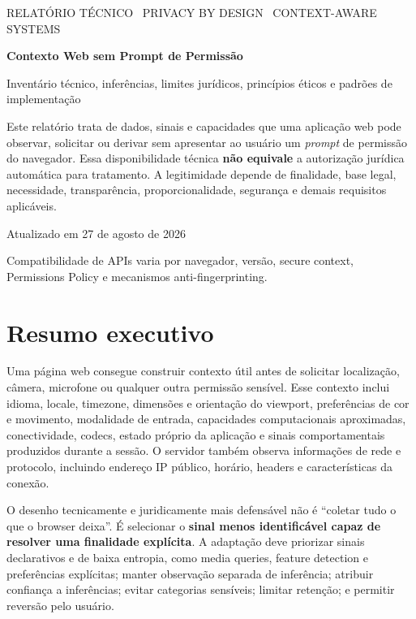 \documentclass[11pt,a4paper]{article}
\begin{document}
\begin{titlepage}
\color{navy}
\vspace*{2cm}
{\small RELATÓRIO TÉCNICO \textbullet\ PRIVACY BY DESIGN \textbullet\ CONTEXT-AWARE SYSTEMS\par}
\vspace{.8cm}
{\Huge\bfseries Contexto Web sem Prompt de Permissão\par}
\vspace{.5cm}
{\Large Inventário técnico, inferências, limites jurídicos, princípios éticos e padrões de implementação\par}
\vfill
\begin{noteBox}[Escopo]
Este relatório trata de dados, sinais e capacidades que uma aplicação web pode observar, solicitar ou derivar sem apresentar ao usuário um \emph{prompt} de permissão do navegador. Essa disponibilidade técnica \textbf{não equivale} a autorização jurídica automática para tratamento. A legitimidade depende de finalidade, base legal, necessidade, transparência, proporcionalidade, segurança e demais requisitos aplicáveis.
\end{noteBox}
\vfill
{\large Atualizado em 27 de agosto de 2026\par}
{\small Compatibilidade de APIs varia por navegador, versão, secure context, Permissions Policy e mecanismos anti-fingerprinting.\par}
\end{titlepage}

\tableofcontents
\newpage

\section{Resumo executivo}
Uma página web consegue construir contexto útil antes de solicitar localização, câmera, microfone ou qualquer outra permissão sensível. Esse contexto inclui idioma, locale, timezone, dimensões e orientação do viewport, preferências de cor e movimento, modalidade de entrada, capacidades computacionais aproximadas, conectividade, codecs, estado próprio da aplicação e sinais comportamentais produzidos durante a sessão. O servidor também observa informações de rede e protocolo, incluindo endereço IP público, horário, headers e características da conexão.

O desenho tecnicamente e juridicamente mais defensável não é ``coletar tudo o que o browser deixa''. É selecionar o \textbf{sinal menos identificável capaz de resolver uma finalidade explícita}. A adaptação deve priorizar sinais declarativos e de baixa entropia, como media queries, feature detection e preferências explícitas; manter observação separada de inferência; atribuir confiança a inferências; evitar categorias sensíveis; limitar retenção; e permitir reversão pelo usuário.
\end{document}
